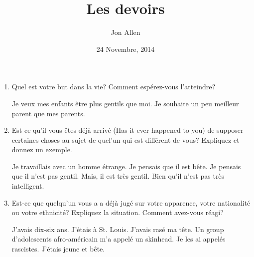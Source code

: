 \documentclass[letterpaper]{article}
\begin{document}
\title{Les devoirs}
\date{24 Novembre, 2014}
\author{Jon Allen}
\maketitle
\begin{spacing}{3.0}
\begin{enumerate}
\item
Quel est votre but dans la vie?  Comment espérez-vous l'atteindre?

Je veux mes enfants être plus gentils que moi. Je souhaite un peu meilleur parent que mes parents.
\item
Est-ce qu'il vous êtes déjà arrivé (Has it ever happened to you) de supposer certaines choses au sujet de quel'un qui est différent de vous?  Expliquez et donnez un exemple.

Je travaillais avec un homme étrange. Je pensais que il est bête. Je pensais que il n'est pas gentil. Mais, il est très gentil. Bien qu'il n'est pas très intelligent.
\item
Est-ce que quelqu'un vous a a déjà jugé sur votre apparence, votre nationalité ou votre ethnicité?  Expliquez la situation.  Comment avez-vous réagi?

J'avais dix-six ans. J'étais à St. Louis. J'avais rasé ma tête. Un group d'adolescents afro-américain m'a appelé un skinhead. Je les ai appelés rascistes. J'étais jeune et bête.
\end{enumerate}
\end{spacing}
\end{document}
